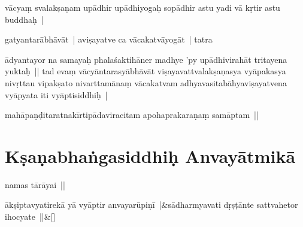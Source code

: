 \documentclass[article,12pt,a4paper]{memoir}%
\newcounter{parCount}
\begin{document}
	  
	  \pstart \leavevmode%
	vācyaṃ svalakṣaṇam upādhir upādhiyogaḥ sopādhir astu yadi vā kṛtir astu buddhaḥ |
	{}
	\pend%
      

	  
	  \pstart \leavevmode%
	gatyantarābhāvāt | aviṣayatve ca vācakatvāyogāt | tatra
	{}
	\pend%
      

	  
	  \pstart \leavevmode%
	ādyantayor na samayaḥ phalaśaktihāner madhye 'py upādhivirahāt tritayena yuktaḥ || \label{thakur75-66.19} tad evaṃ vācyāntarasyābhāvāt viṣayavattvalakṣaṇasya vyāpakasya nivṛttau vipakṣato nivarttamānaṃ vācakatvam adhyavasitabāhyaviṣayatvena vyāpyata iti vyāptisiddhiḥ |
	{}
	\pend%
      

	  
	  \pstart \leavevmode%
	mahāpaṇḍitaratnakīrtipādaviracitam apohaprakaraṇaṃ samāptam || 
	{}
	\pend%
      
	    
	    \endnumbering%
	    
	  
	  
	
	    
	    \beginnumbering%
	    
	  
\chapter[{Kṣaṇabhaṅgasiddhiḥ Anvayātmikā}][{Kṣaṇabhaṅgasiddhiḥ Anvayātmikā}]{Kṣaṇabhaṅgasiddhiḥ  Anvayātmikā}\label{Kṣaṇabhaṅgasiddhiḥ_Anvayātmikā}

	  
	  \pstart \leavevmode%
	\label{thakur75-67.3}namas tārāyai ||
	{}
	\pend%
      
	    
	    \stanza[\smallbreak]
	  \label{ratnakīrtinibandhāvali__36r1OI6NR531EDRWPU9XOG3N62S}ākṣiptavyatirekā yā vyāptir anvayarūpiṇī |&sādharmyavati dṛṣṭānte sattvahetor ihocyate ||\&[\smallbreak]
	  
	  
	  
\end{document}
